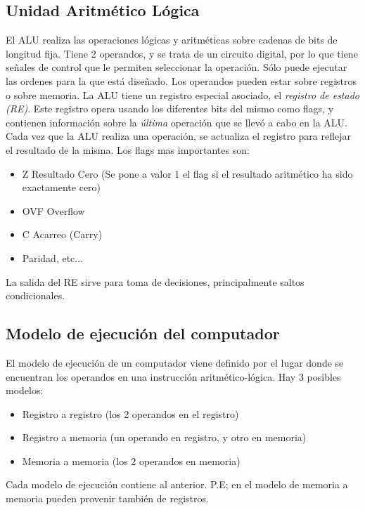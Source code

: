 \documentclass[a4paper,11pt,spanish]{report}
\begin{document}
\subsection{Unidad Aritmético Lógica}
El ALU realiza las operaciones lógicas y aritméticas sobre cadenas de bits de longitud fija. Tiene 2 operandos, y se trata de un circuito digital, por lo que tiene señales de control que le permiten seleccionar la operación. Sólo puede ejecutar las ordenes para la que está diseñado. Los operandos pueden estar sobre registros o sobre memoria.
La ALU tiene un registro especial asociado, el \emph{registro de estado (RE)}. Este registro opera usando los diferentes bits del mismo como flags, y contienen información sobre la \emph{última} operación que se llevó a cabo en la ALU. Cada vez que la ALU realiza una operación, se actualiza el registro para reflejar el resultado de la misma. Los flags mas importantes son:
\begin{itemize}
\item Z \textrightarrow Resultado Cero (Se pone a valor 1 el flag si el resultado aritmético ha sido exactamente cero)
\item OVF \textrightarrow Overflow
\item C \textrightarrow Acarreo (Carry)
\item Paridad, etc...
\end{itemize}
La salida del RE sirve para toma de decisiones, principalmente saltos condicionales.
\subsection{Modelo de ejecución del computador}
El modelo de ejecución de un computador viene definido por el lugar donde se encuentran los operandos en una instrucción aritmético-lógica. Hay 3 posibles modelos:
\begin{itemize}
\item Registro a registro (los 2 operandos en el registro)
\item Registro a memoria (un operando en registro, y otro en memoria)
\item Memoria a memoria (los 2 operandos en memoria)
\end{itemize}
Cada modelo de ejecución contiene al anterior. P.E; en el modelo de memoria a memoria pueden provenir también de registros.
\end{document}
